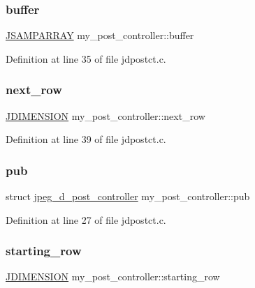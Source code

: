 \subsubsection{\texorpdfstring{buffer}{buffer}}
{\footnotesize\ttfamily \mbox{\hyperlink{jpeglib_8h_ac9d5d1b829ed51769db69a37271a7e91}{J\+S\+A\+M\+P\+A\+R\+R\+AY}} my\+\_\+post\+\_\+controller\+::buffer}



Definition at line 35 of file jdpostct.\+c.

\mbox{\label{structmy__post__controller_a9aa9e3077c24ae10e47972c1955c6d38}} 
\subsubsection{\texorpdfstring{next\_row}{next\_row}}
{\footnotesize\ttfamily \mbox{\hyperlink{jmorecfg_8h_a04ed4674f6f1d0d50ec241531e38274f}{J\+D\+I\+M\+E\+N\+S\+I\+ON}} my\+\_\+post\+\_\+controller\+::next\+\_\+row}



Definition at line 39 of file jdpostct.\+c.

\mbox{\label{structmy__post__controller_a4618ce845c38c4c563bdd28af061b727}} 
\subsubsection{\texorpdfstring{pub}{pub}}
{\footnotesize\ttfamily struct \mbox{\hyperlink{structjpeg__d__post__controller}{jpeg\+\_\+d\+\_\+post\+\_\+controller}} my\+\_\+post\+\_\+controller\+::pub}



Definition at line 27 of file jdpostct.\+c.

\mbox{\label{structmy__post__controller_a1e762395815d8f552d1a412cb5201575}} 
\subsubsection{\texorpdfstring{starting\_row}{starting\_row}}
{\footnotesize\ttfamily \mbox{\hyperlink{jmorecfg_8h_a04ed4674f6f1d0d50ec241531e38274f}{J\+D\+I\+M\+E\+N\+S\+I\+ON}} my\+\_\+post\+\_\+controller\+::starting\+\_\+row}



